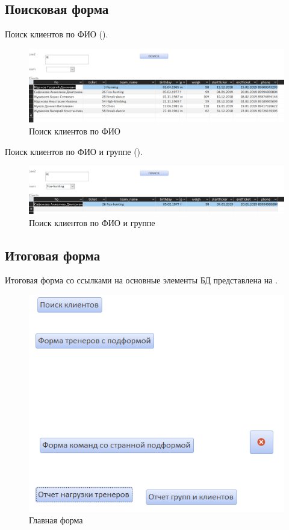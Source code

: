 \documentclass[a4paper,14pt]{article}
\begin{document}
\subsection{Поисковая форма}

	Поиск клиентов по ФИО ().
	
	\begin{figure}[H]
		\centering		
		\includegraphics[width=\linewidth]{image/5_find_1}
		\caption{Поиск клиентов по ФИО}\label{img:5_find_1}
	\end{figure}
	
	Поиск клиентов по ФИО и группе ().
	
	\begin{figure}[H]
		\centering		
		\includegraphics[width=\linewidth]{image/5_find_2}
		\caption{Поиск клиентов по ФИО и группе}\label{img:5_find_2}
	\end{figure}

\subsection{Итоговая форма}

	Итоговая форма со ссылками на основные элементы БД представлена на .
	
	\begin{figure}[H]
		\centering		
		\includegraphics[width=0.5\linewidth]{image/5_mainform}
		\caption{Главная форма}\label{img:5_mainform}
	\end{figure}
	
\end{document}
